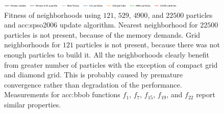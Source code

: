 \begin{figure}[ht!]
    \begin{minipage}{\textwidth}
        \centering
        \includegraphics[width=0.8\textwidth]{img/runs/fitness_pso_neigh_legend.pdf}
    \end{minipage}

    \caption[Fitness of PSO neighborhoods]{Fitness of neighborhoods using $121$, $529$, $4900$, and $22500$ particles and \acrshort{acc:spso2006} update algorithm. Nearest neighborhood for $22500$ particles is not present, because of the memory demands. Grid neighborhoods for $121$ particles is not present, because there was not enough particles to build it. 
    All the neighborhoods clearly benefit from greater number of particles with the exception of compact grid and diamond grid. This is probably caused by premature convergence rather than degradation of the performance.
    Measurements for \acrshort{acc:bbob} functions $f_1$, $f_7$, $f_{15}$, $f_{19}$, and $f_{22}$ report similar properties.}
    \label{meas:psoneigfitness}
\end{figure}




